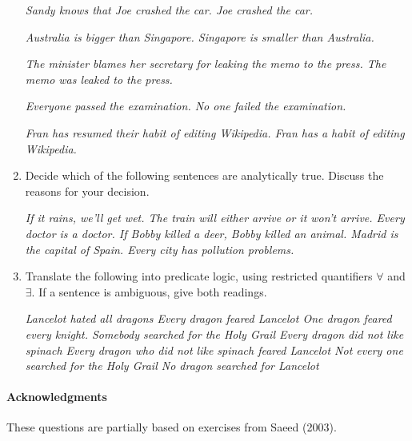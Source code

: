 \documentclass[a4paper]{article}
\newcommand{\ix}{\ex\it}
\begin{document}
\begin{enumerate}
\begin{exe}
\ex
  \begin{xlist}
 \ix Sandy knows that Joe crashed the car. 
 \ix Joe crashed the car. 
\end{xlist}
\ex 
  \begin{xlist}
    \ix Australia is bigger than Singapore. 
    \ix Singapore is smaller than Australia. 
  \end{xlist}
\ex 
  \begin{xlist}
\ix The minister blames her secretary for leaking the memo to the press. 
\ix The memo was leaked to the press. 
\end{xlist}
\ex 
  \begin{xlist}
\ix Everyone passed the examination. 
\ix No one failed the examination. 
\end{xlist}
\ex 
\begin{xlist}
  \ix Fran has resumed their habit of editing Wikipedia. 
  \ix Fran has a habit of editing Wikipedia. 
\end{xlist}
\end{exe}

\newpage
\item  Decide which of the 
following sentences are analytically true. Discuss the reasons for your decision. 
\begin{exe}
  \ix If it rains, we'll get wet. 
  \ix The train will either arrive or it won't arrive. 
  \ix Every doctor is a doctor. 
  \ix If Bobby killed a deer, Bobby killed an animal. 
  \ix Madrid is the capital of Spain. 
  \ix Every city has pollution problems. 
\end{exe}

\item Translate the following into predicate logic, using restricted
  quantifiers $\forall$ and $\exists$.  If a sentence is ambiguous,
  give both readings.
  \begin{exe}
    \ix Lancelot hated all dragons
    \ix Every dragon feared Lancelot
    \ix One dragon feared every knight.
    \ix Somebody searched for the Holy Grail
    \ix Every dragon did not like spinach
    \ix Every dragon who did not like spinach feared Lancelot
    \ix Not every one searched for the Holy Grail
    \ix No dragon searched for Lancelot
  \end{exe}
\end{enumerate}

\vfill
\paragraph{Acknowledgments} These questions are partially
based on exercises from Saeed (2003).
\end{document}
